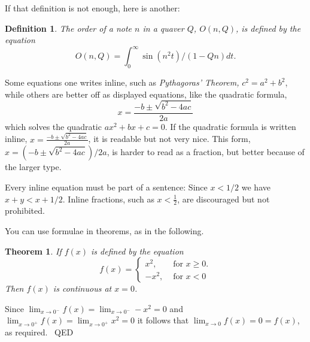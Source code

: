 \documentclass{article}
\newtheorem{theorem}{Theorem}
\newtheorem{definition}{Definition}
\newenvironment{proof}{{\sc Proof:}}{~\hfill QED}
\begin{document}
If that definition is not enough, here is another:

\begin{definition}
    The {\em order} of a note $n$ in a quaver $Q$,
    $O(n,Q)$, is defined by the equation
         $$ O(n,Q) = \int_{0}^{\infty} \sin(n^{2} t)/(1-Qn) dt. $$
\end{definition}

Some equations one writes inline, such as
{\em Pythagoras' Theorem,}
$c^{2} = a^{2} + b^{2}$,
while others are better off as displayed
equations, like the quadratic formula,
  $$x = \frac{-b \pm \sqrt{b^{2} - 4ac}}{2a}$$
which solves the quadratic $ax^{2} + bx + c = 0$. If the quadratic
formula is written inline,
  $x = \frac{-b \pm \sqrt{b^{2} - 4ac}}{2a}$,
it is readable but not very nice.
This form,
  $x = (-b \pm \sqrt{b^{2} - 4ac})/2a$,
is harder to read as a fraction, but better because of the larger type.

Every inline equation must be part of a sentence:  Since $x < 1/2$ we have
$x + y < x + 1/2$.  Inline fractions, such as $x < \frac{1}{2}$, are discouraged but
not prohibited.


You can use formulae in theorems, as in the following.

\begin{theorem}\label{ContThrm}
    If $f(x)$ is defined by the equation
    \begin{equation}\label{SplitFunc}
         f(x) = \left\{ \begin{array}{rl}
                          x^{2}, & \mbox{~for $x \geq 0$.} \\
                         -x^{2}, & \mbox{~for $x < 0$}
                         \end{array} \right.
   \end{equation}
   Then $f(x)$ is continuous at $x=0$.
\end{theorem}


\begin{proof}
    Since
          $\lim_{x \rightarrow 0^{-}} f(x) =
           \lim_{x \rightarrow 0^{-}} -x^{2} = 0$
    and
          $\lim_{x \rightarrow 0^{+}} f(x) =
           \lim_{x \rightarrow 0^{+}} x^{2} = 0$
    it follows that
         $\lim_{x \rightarrow 0} f(x) = 0 = f(x)$,
         as required.
\end{proof}
\end{document}
